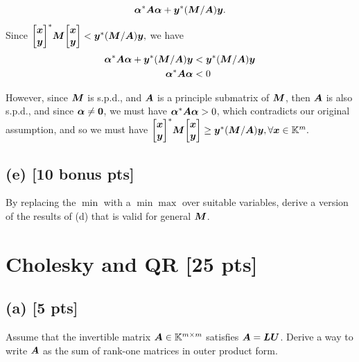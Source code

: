 \documentclass[twoside,10pt]{article}
\begin{document}
\begin{equation*}
  \vct{\alpha}^{*}\mtx{A}\vct{\alpha} + \vct{y}^{*}\left(\mtx{M} / \mtx{A}\right)\vct{y}.
\end{equation*}
Since $\begin{bmatrix}\vct{x}\\\vct{y}\end{bmatrix}^{*}\mtx{M}\begin{bmatrix}\vct{x}\\\vct{y}\end{bmatrix} < \vct{y}^* \left(\mtx{M} / \mtx{A}\right) \vct{y},$ we have
\begin{align*}
  \vct{\alpha}^{*}\mtx{A}\vct{\alpha} + \vct{y}^{*}\left(\mtx{M} / \mtx{A}\right)\vct{y} &< \vct{y}^* \left(\mtx{M} / \mtx{A}\right) \vct{y}\\
  \vct{\alpha}^{*}\mtx{A}\vct{\alpha} &< 0
\end{align*}

However, since $\bm{M}$ is s.p.d., and $\bm{A}$ is a principle submatrix of $\bm{M}$, then $\bm{A}$ is also s.p.d., and since $\bm{\alpha} \neq \bm{0}$, we must have $\bm{\alpha}^{*}\bm{A}\bm{\alpha} > 0$, which contradicts our original assumption, and so we must have
$\begin{bmatrix}\vct{x}\\\vct{y}\end{bmatrix}^{*}\mtx{M}\begin{bmatrix}\vct{x}\\\vct{y}\end{bmatrix} \geq \vct{y}^* \left(\mtx{M} / \mtx{A}\right) \vct{y}, \forall \vct{x} \in \K^{m}.$

\subsection*{(e) [10 bonus pts]} 
By replacing the $\min$ with a $\min \max$ over suitable variables, derive a version of the results of (d) that is valid for general $\bm{M}$.

\section{Cholesky and QR [25 pts]}

\subsection*{(a) [5 pts]}
Assume that the invertible matrix $\bm{A} \in \mathbb{K}^{m \times m}$ satisfies $\bm{A} = \bm{L} \bm{U}$.   
Derive a way to write $\bm{A}$ as the sum of rank-one matrices in outer product form. 
\end{document}
